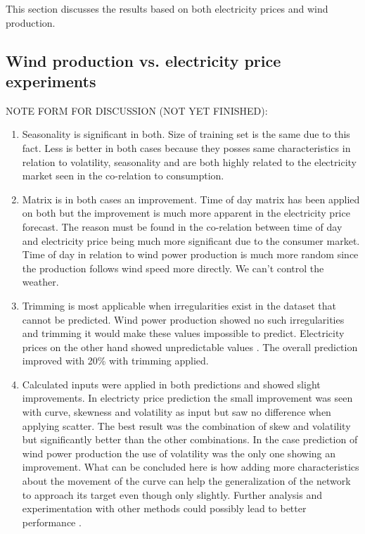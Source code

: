 This section discusses the results based on both electricity prices and wind production.

\subsection{Wind production vs. electricity price experiments}
NOTE FORM FOR DISCUSSION (NOT YET FINISHED):

\begin{enumerate}
\item Seasonality is significant in both. Size of training set is the same due  to this fact. Less is better in both cases because they posses same characteristics in relation to volatility, seasonality and are both highly related to the electricity market seen in the co-relation to consumption.
\item Matrix is in both cases an improvement. Time of day matrix has been applied on both but the improvement is much more apparent in the electricity price forecast. The reason must be found in the co-relation between time of day and electricity price being much more significant due to the consumer market. Time of day in relation to wind power production is much more random since the production follows wind speed more directly. We can't control the weather. 
\item Trimming is most applicable when irregularities exist in the dataset that cannot be predicted. Wind power production showed no such irregularities and trimming it would make these values impossible to predict. Electricity prices on the other hand showed unpredictable values . The overall prediction improved with 20\% with trimming applied.
\item Calculated inputs were applied in both predictions and showed slight improvements. In electricty price prediction the small improvement was seen with curve, skewness and volatility as input but saw no difference when applying scatter. The best result was the combination of skew and volatility but significantly better than the other combinations. In the case prediction of wind power production the use of volatility was the only one showing an improvement. What can be concluded here is how adding more characteristics about the movement of the curve can help the generalization of the network to approach its target even though only slightly. Further analysis and experimentation with other methods could possibly lead to better performance .

\end{enumerate}
